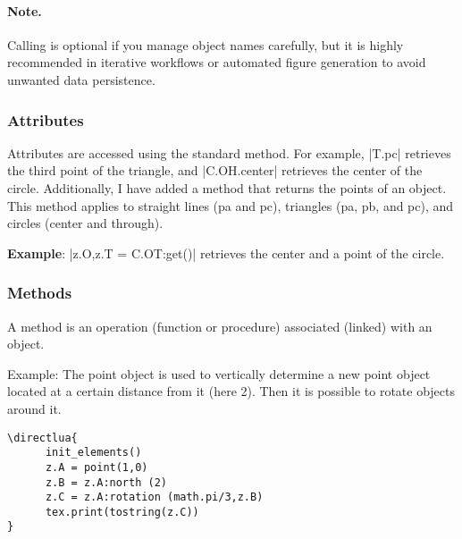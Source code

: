 \paragraph{Note.}
Calling  is optional if you manage object names carefully, but it is highly recommended in iterative workflows or automated figure generation to avoid unwanted data persistence.

\subsubsection{Attributes}
 \label{ssub:attributes}

Attributes are accessed using the standard method. For example, |T.pc| retrieves the third point of the triangle, and |C.OH.center| retrieves the center of the circle. Additionally, I have added a method  that returns the points of an object. This method applies to straight lines (pa and pc), triangles (pa, pb, and pc), and circles (center and through).

\vspace{1em}
\noindent
  \textbf{Example}: |z.O,z.T = C.OT:get()| retrieves the center and a point of the circle.

\subsubsection{Methods}
\label{ssub:methods}

A method is an operation (function or procedure) associated (linked) with an object.

Example:   The point object is used to vertically determine a new point object located at a certain distance from it (here 2). Then it is possible to rotate objects around it.

\begin{verbatim}
\directlua{
      init_elements()
      z.A = point(1,0)
      z.B = z.A:north (2)
      z.C = z.A:rotation (math.pi/3,z.B)
      tex.print(tostring(z.C))
}
\end{verbatim}

\endinput